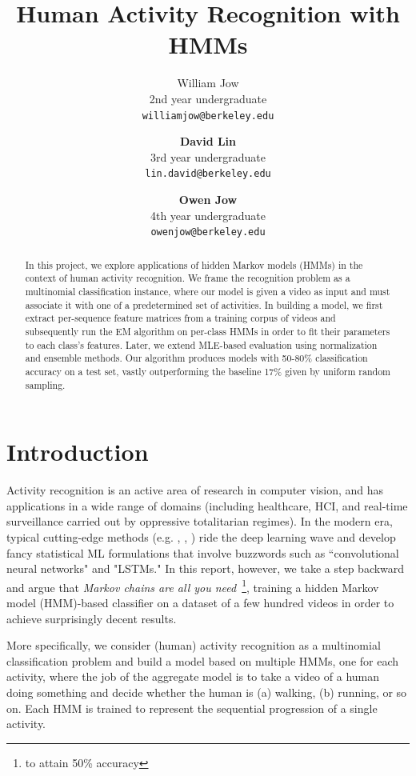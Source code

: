 \documentclass{article}
\title{Human Activity Recognition with HMMs}
\author{
  William Jow \\
  2nd year undergraduate \\
  \texttt{williamjow@berkeley.edu}
  \and
  \textbf{David Lin} \\
  3rd year undergraduate \\
  \texttt{lin.david@berkeley.edu}
  \and
  \textbf{Owen Jow} \\
  4th year undergraduate \\
  \texttt{owenjow@berkeley.edu}
}
\begin{document}
\maketitle

\begin{abstract}

In this project, we explore applications of hidden Markov models (HMMs) in the context of human activity recognition. We frame the recognition problem as a multinomial classification instance, where our model is given a video as input and must associate it with one of a predetermined set of activities. In building a model, we first extract per-sequence feature matrices from a training corpus of videos and subsequently run the EM algorithm on per-class HMMs in order to fit their parameters to each class's features. Later, we extend MLE-based evaluation using normalization and ensemble methods. Our algorithm produces models with 50-80\% classification accuracy on a test set, vastly outperforming the baseline 17\% given by uniform random sampling.

\end{abstract}

\section{Introduction}

Activity recognition is an active area of research in computer vision, and has applications in a wide range of domains (including healthcare, HCI, and real-time surveillance carried out by oppressive totalitarian regimes). In the modern era, typical cutting-edge methods (e.g. \cite{cz2017}, \cite{bwmt2018}, \cite{lyc2017}) ride the deep learning wave and develop fancy statistical ML formulations that involve buzzwords such as ``convolutional neural networks" and "LSTMs." In this report, however, we take a step backward and argue that \textit{Markov chains are all you need}~\footnote{to attain 50\% accuracy}, training a hidden Markov model (HMM)-based classifier on a dataset of a few hundred videos in order to achieve surprisingly decent results.

More specifically, we consider (human) activity recognition as a multinomial classification problem and build a model based on multiple HMMs, one for each activity, where the job of the aggregate model is to take a video of a human doing something and decide whether the human is (a) walking, (b) running, or so on. Each HMM is trained to represent the sequential progression of a single activity.
\end{document}
